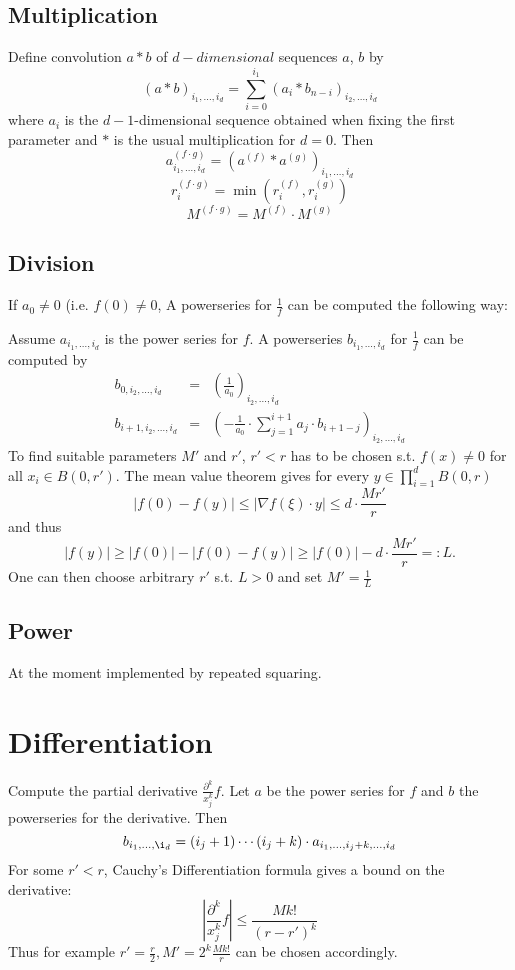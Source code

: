 \documentclass[]{article}
\newcommand{\abs}[1]{\left|#1\right|}
\begin{document}
\subsection{Multiplication}
Define convolution $a * b$ of $d-dimensional$ sequences $a$, $b$ by 
$$ (a * b)_{i_1, \dots, i_d} = \sum_{i=0}^{i_1} (a_i * b_{n-i})_{i_2, \dots, i_d} $$
where $a_i$ is the $d-1$-dimensional sequence obtained when fixing the first parameter and $*$ is the usual multiplication for $d=0$.
Then
$$a^{(f \cdot g)}_{i_1,\dots,i_d} = (a^{(f)}*a^{(g)})_{i_1, \dots, i_d}$$
$$r_i^{(f \cdot g)} = \min(r_i^{(f)}, r_i^{(g)}) $$
$$M^{(f \cdot g)} = M^{(f)} \cdot M^{(g)}$$
\subsection{Division}
If $a_0 \neq 0$ (i.e. $f(0) \neq 0$, A powerseries for $\frac{1}{f}$ can be computed the following way:

Assume $a_{i_1,\dots, i_d}$ is the power series for $f$. 
A powerseries $b_{i_1,\dots, i_d}$ for $\frac{1}{f}$ can be computed by
\begin{eqnarray*}
b_{0, i_2, \dots, i_d} &=& \left(\frac{1}{a_0}\right)_{i_2, \dots, i_d} \\
b_{i+1, i_2, \dots, i_d} &=& \left( -\frac{1}{a_0} \cdot \sum_{j=1}^{i+1}a_j \cdot b_{i+1-j}\right)_{i_2,\dots,i_d}
\end{eqnarray*}
To find suitable parameters $M'$ and $r'$, $r'<r$ has to be chosen s.t. $f(x) \neq 0$ for all $x_i \in B(0, r')$. 
The mean value theorem gives for every $y \in \prod_{i=1}^d B(0, r)$
$$ \abs{f(0)-f(y)} \leq \abs{\nabla f(\xi) \cdot y} \leq d \cdot \frac{Mr'}{r}$$
and thus
\begin{equation*}\label{divlowerbound}
\abs{f(y)} \geq \abs{f(0)}-\abs{f(0)-f(y)} \geq \abs{f(0)}-d\cdot \frac{Mr'}{r} =: L.
\end{equation*}
One can then choose arbitrary $r'$ s.t. $L > 0$ and set $M' = \frac{1}{L}$
\subsection{Power}
At the moment implemented by repeated squaring.
\section{Differentiation}
Compute the partial derivative $\frac{\partial^k}{x_j^k}f$.
Let $a$ be the power series for $f$ and $b$ the powerseries for the derivative.
Then
$$ b_{i_1,\dots, \i_d} = (i_j+1) \cdots (i_j+k) \cdot a_{i_1, \dots, i_j+k, \dots, i_d} $$
For some $r' < r$, Cauchy's Differentiation formula gives a bound on the derivative:
$$\abs{\frac{\partial^k}{x_j^k}f} \leq \frac{Mk!}{(r-r')^k}$$
Thus for example $r'=\frac{r}{2}, M'=2^k\frac{Mk!}{r}$ can be chosen accordingly.
\end{document}
